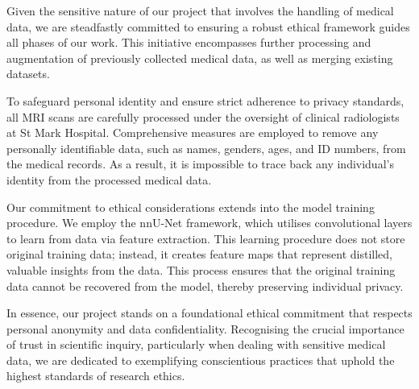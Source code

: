 Given the sensitive nature of our project that involves the handling of medical data, we are steadfastly committed to ensuring a robust ethical framework guides all phases of our work. This initiative encompasses further processing and augmentation of previously collected medical data, as well as merging existing datasets.

To safeguard personal identity and ensure strict adherence to privacy standards, all MRI scans are carefully processed under the oversight of clinical radiologists at St Mark Hospital. Comprehensive measures are employed to remove any personally identifiable data, such as names, genders, ages, and ID numbers, from the medical records. As a result, it is impossible to trace back any individual's identity from the processed medical data.

Our commitment to ethical considerations extends into the model training procedure. We employ the nnU-Net framework, which utilises convolutional layers to learn from data via feature extraction. This learning procedure does not store original training data; instead, it creates feature maps that represent distilled, valuable insights from the data. This process ensures that the original training data cannot be recovered from the model, thereby preserving individual privacy.

In essence, our project stands on a foundational ethical commitment that respects personal anonymity and data confidentiality. Recognising the crucial importance of trust in scientific inquiry, particularly when dealing with sensitive medical data, we are dedicated to exemplifying conscientious practices that uphold the highest standards of research ethics.